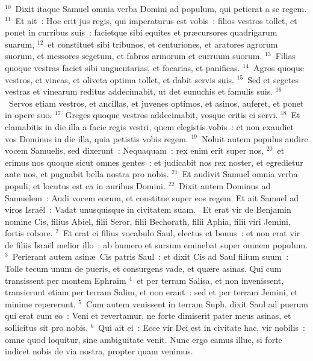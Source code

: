 ${}^{10}$~Dixit itaque Samuel omnia verba Domini ad populum, qui petierat a se regem.
${}^{11}$~Et ait~: Hoc erit jus regis, qui imperaturus est vobis~: filios vestros tollet, et ponet in curribus suis~: facietque sibi equites et pr\ae cursores quadrigarum suarum,
${}^{12}$~et constituet sibi tribunos, et centuriones, et aratores agrorum suorum, et messores segetum, et fabros armorum et curruum suorum.
${}^{13}$~Filias quoque vestras faciet sibi unguentarias, et focarias, et panificas.
${}^{14}$~Agros quoque vestros, et vineas, et oliveta optima tollet, et dabit servis suis.
${}^{15}$~Sed et segetes vestras et vinearum reditus addecimabit, ut det eunuchis et famulis suis.
${}^{16}$~Servos etiam vestros, et ancillas, et juvenes optimos, et asinos, auferet, et ponet in opere suo.
${}^{17}$~Greges quoque vestros addecimabit, vosque eritis ei servi.
${}^{18}$~Et clamabitis in die illa a facie regis vestri, quem elegistis vobis~: et non exaudiet vos Dominus in die illa, quia petistis vobis regem.
${}^{19}$~Noluit autem populus audire vocem Samuelis, sed dixerunt~: Nequaquam~: rex enim erit super nos,
${}^{20}$~et erimus nos quoque sicut omnes gentes~: et judicabit nos rex noster, et egredietur ante nos, et pugnabit bella nostra pro nobis.
${}^{21}$~Et audivit Samuel omnia verba populi, et locutus est ea in auribus Domini.
${}^{22}$~Dixit autem Dominus ad Samuelem~: Audi vocem eorum, et constitue super eos regem. Et ait Samuel ad viros Isra\"el~: Vadat unusquisque in civitatem suam.
~\lettrine[lines=10,image=true,loversize=0.05,lraise=-0.03]{E}{}t erat vir de Benjamin nomine Cis, filius Abiel, filii Seror, filii Bechorath, filii Aphia, filii viri Jemini, fortis robore.
${}^{2}$~Et erat ei filius vocabulo Saul, electus et bonus~: et non erat vir de filiis Isra\"el melior illo~: ab humero et sursum eminebat super omnem populum.
${}^{3}$~Perierant autem asin\ae\ Cis patris Saul~: et dixit Cis ad Saul filium suum~: Tolle tecum unum de pueris, et consurgens vade, et qu\ae re asinas. Qui cum transissent per montem Ephraim
${}^{4}$~et per terram Salisa, et non invenissent, transierunt etiam per terram Salim, et non erant~: sed et per terram Jemini, et minime repererunt.
${}^{5}$~Cum autem venissent in terram Suph, dixit Saul ad puerum qui erat cum eo~: Veni et revertamur, ne forte dimiserit pater meus asinas, et sollicitus sit pro nobis.
${}^{6}$~Qui ait ei~: Ecce vir Dei est in civitate hac, vir nobilis~: omne quod loquitur, sine ambiguitate venit. Nunc ergo eamus illuc, si forte indicet nobis de via nostra, propter quam venimus.
